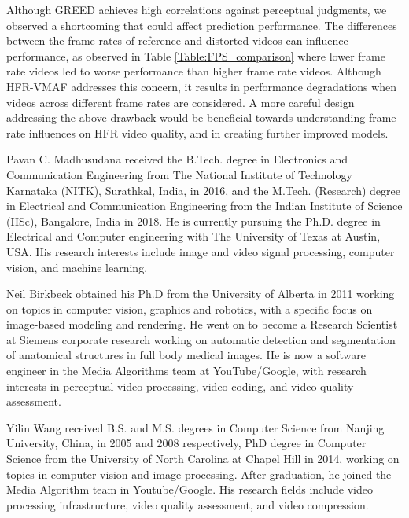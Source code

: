 \documentclass[journal]{IEEEtran}
\begin{document}
Although GREED achieves high correlations against perceptual judgments, we observed a shortcoming that could affect prediction performance. The differences between the frame rates of reference and distorted videos can influence performance, as observed in Table \ref{Table:FPS_comparison} where lower frame rate videos led to worse performance than higher frame rate videos. Although HFR-VMAF addresses this concern, it results in performance degradations when videos across different frame rates are considered. A more careful design addressing the above drawback would be beneficial towards understanding frame rate influences on HFR video quality, and in creating further improved models.

\ifCLASSOPTIONcaptionsoff
  \newpage
\fi





\begin{IEEEbiography}{Pavan C. Madhusudana}
received the B.Tech. degree in Electronics and Communication Engineering from The National Institute of Technology Karnataka (NITK), Surathkal, India, in 2016, and the M.Tech. (Research) degree in Electrical and Communication Engineering from the Indian Institute of Science (IISc), Bangalore, India in 2018. He is currently pursuing the Ph.D. degree in Electrical and Computer engineering with The University of Texas at Austin, USA. His research interests include image and video signal processing, computer vision, and machine learning.
\end{IEEEbiography}

\begin{IEEEbiography}
{Neil Birkbeck} obtained his Ph.D from the University of Alberta in 2011 working on topics in computer vision, graphics and robotics, with a specific focus on image-based modeling and rendering. He went on to become a Research Scientist at Siemens corporate research working on automatic detection and segmentation of anatomical structures in full body medical images. He is now a software engineer in the Media Algorithms team at YouTube/Google, with research interests in perceptual video processing, video coding, and video quality assessment.
\end{IEEEbiography}

\begin{IEEEbiography}
{Yilin Wang}
received B.S. and M.S. degrees in Computer Science from Nanjing University, China, in 2005 and 2008 respectively, PhD degree in Computer Science from the University of North Carolina at Chapel Hill in 2014, working on topics in computer vision and image processing. After graduation, he joined the Media Algorithm team in Youtube/Google. His research fields include video processing infrastructure, video quality assessment, and video compression.
\end{IEEEbiography}
\end{document}
